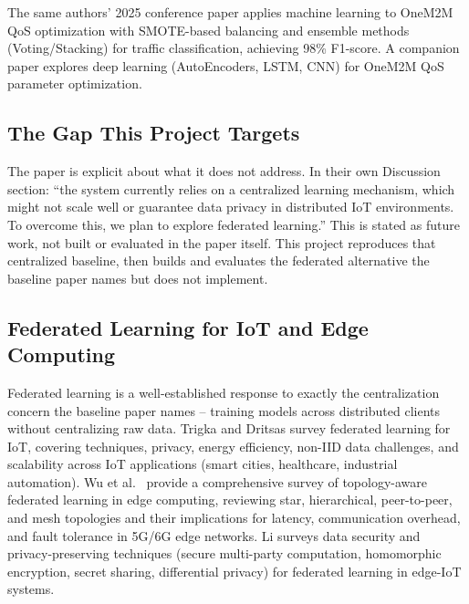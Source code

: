 The same authors' 2025 conference paper \cite{EtTousy25FiCloud} applies machine learning to OneM2M QoS optimization with SMOTE-based balancing and ensemble methods (Voting/Stacking) for traffic classification, achieving 98\% F1-score. A companion paper \cite{Zyane25FiCloud} explores deep learning (AutoEncoders, LSTM, CNN) for OneM2M QoS parameter optimization.

\subsection{The Gap This Project Targets}
\label{subsec:gap}

The paper is explicit about what it does not address. In their own Discussion section: ``the system currently relies on a centralized learning mechanism, which might not scale well or guarantee data privacy in distributed IoT environments. To overcome this, we plan to explore federated learning.'' This is stated as future work, not built or evaluated in the paper itself. This project reproduces that centralized baseline, then builds and evaluates the federated alternative the baseline paper names but does not implement.

\subsection{Federated Learning for IoT and Edge Computing}
\label{subsec:fl-iot}

Federated learning is a well-established response to exactly the centralization concern the baseline paper names -- training models across distributed clients without centralizing raw data. Trigka and Dritsas \cite{Trigka25JSAN} survey federated learning for IoT, covering techniques, privacy, energy efficiency, non-IID data challenges, and scalability across IoT applications (smart cities, healthcare, industrial automation). Wu et al.\ \cite{Wu24ACM} provide a comprehensive survey of topology-aware federated learning in edge computing, reviewing star, hierarchical, peer-to-peer, and mesh topologies and their implications for latency, communication overhead, and fault tolerance in 5G/6G edge networks. Li \cite{Li24AIR} surveys data security and privacy-preserving techniques (secure multi-party computation, homomorphic encryption, secret sharing, differential privacy) for federated learning in edge-IoT systems.

